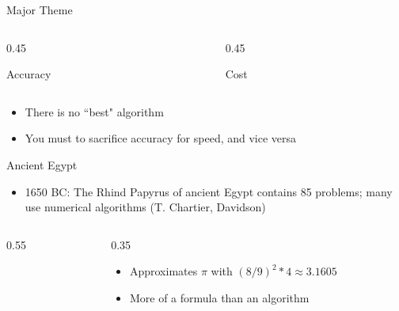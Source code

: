 \documentclass[10pt]{beamer}
\begin{document}
\begin{frame}{Major Theme}
\begin{columns}
\begin{column}{0.45\textwidth}

\begin{center}
  \begin{block}{}
    Accuracy
  \end{block}
\end{center}
\end{column}

\begin{column}{0.45\textwidth}

\begin{center}
  \begin{block}{}
    Cost
  \end{block}
\end{center}
\end{column}
\end{columns}
\begin{itemize}
    \item There is no ``best" algorithm
    \item You must to sacrifice accuracy for speed, and vice versa
\end{itemize}
\end{frame}
\begin{frame}{Ancient Egypt}
\begin{itemize}
\item 1650 BC: The Rhind Papyrus of ancient Egypt contains 85
problems; many use numerical algorithms (T. Chartier, Davidson)
\end{itemize}
\begin{columns}
  \begin{column}{0.55\textwidth}
  \end{column}
  \begin{column}{0.35\textwidth}
    \begin{itemize}
        \item Approximates $\pi$ with $(8/9)^2 * 4 \approx 3.1605$\\[5mm]

        \item More of a formula than an algorithm
    \end{itemize}
  \end{column}
\end{columns}
\end{frame}
\end{document}
